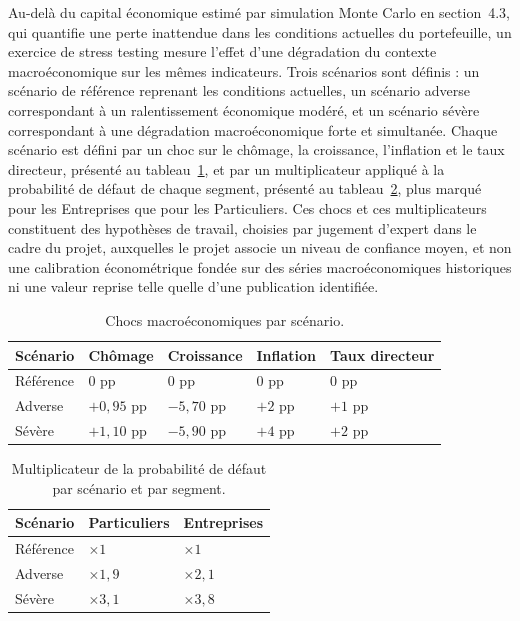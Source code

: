 Au-delà du capital économique estimé par simulation Monte Carlo en section~4.3, qui quantifie une perte inattendue dans les conditions actuelles du portefeuille, un exercice de stress testing mesure l'effet d'une dégradation du contexte macroéconomique sur les mêmes indicateurs. Trois scénarios sont définis : un scénario de référence reprenant les conditions actuelles, un scénario adverse correspondant à un ralentissement économique modéré, et un scénario sévère correspondant à une dégradation macroéconomique forte et simultanée. Chaque scénario est défini par un choc sur le chômage, la croissance, l'inflation et le taux directeur, présenté au tableau~\ref{tab:stress-macro}, et par un multiplicateur appliqué à la probabilité de défaut de chaque segment, présenté au tableau~\ref{tab:stress-pd}, plus marqué pour les Entreprises que pour les Particuliers. Ces chocs et ces multiplicateurs constituent des hypothèses de travail, choisies par jugement d'expert dans le cadre du projet, auxquelles le projet associe un niveau de confiance moyen, et non une calibration économétrique fondée sur des séries macroéconomiques historiques ni une valeur reprise telle quelle d'une publication identifiée.

\begin{table}[htbp]
    \centering
    \footnotesize
    \caption{Chocs macroéconomiques par scénario.}
    \label{tab:stress-macro}
    \begin{tabular}{p{2.6cm}p{2.6cm}p{2.6cm}p{2.6cm}p{2.6cm}}
        \toprule
        \textbf{Scénario} & \textbf{Chômage} & \textbf{Croissance} & \textbf{Inflation} & \textbf{Taux directeur} \\
        \midrule
        Référence & 0 pp & 0 pp & 0 pp & 0 pp \\
        Adverse & $+0,95$ pp & $-5,70$ pp & $+2$ pp & $+1$ pp \\
        Sévère & $+1,10$ pp & $-5,90$ pp & $+4$ pp & $+2$ pp \\
        \bottomrule
    \end{tabular}
\end{table}

\begin{table}[htbp]
    \centering
    \footnotesize
    \caption{Multiplicateur de la probabilité de défaut par scénario et par segment.}
    \label{tab:stress-pd}
    \begin{tabular}{p{3cm}p{3cm}p{3cm}}
        \toprule
        \textbf{Scénario} & \textbf{Particuliers} & \textbf{Entreprises} \\
        \midrule
        Référence & $\times 1$ & $\times 1$ \\
        Adverse & $\times 1,9$ & $\times 2,1$ \\
        Sévère & $\times 3,1$ & $\times 3,8$ \\
        \bottomrule
    \end{tabular}
\end{table}

